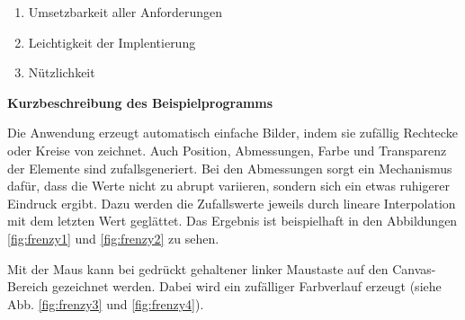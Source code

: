 \documentclass[a4paper, 12pt, hidelinks, listof=totoc, listoftables=totoc, bibliography=totoc]{scrreprt}
\newcommand{\MyMiniSec}[1]{\rmfamily\fontsize{12}{15}\selectfont
	\vspace{7pt}\textbf{#1} %
}
\begin{document}

\begin{enumerate}
	\item Umsetzbarkeit aller Anforderungen
	\item Leichtigkeit der Implentierung
	\item Nützlichkeit
\end{enumerate}

\MyMiniSec{Kurzbeschreibung des Beispielprogramms}

Die Anwendung erzeugt automatisch einfache Bilder, indem sie zufällig Rechtecke oder Kreise von zeichnet. Auch Position, Abmessungen, Farbe und Transparenz der Elemente sind zufallsgeneriert. Bei den Abmessungen sorgt ein Mechanismus dafür, dass die Werte nicht zu abrupt variieren, sondern sich ein etwas ruhigerer Eindruck ergibt. Dazu werden die Zufallswerte jeweils durch lineare Interpolation mit dem letzten Wert geglättet. Das Ergebnis ist beispielhaft in den Abbildungen \ref{fig:frenzy1} und \ref{fig:frenzy2} zu sehen.

Mit der Maus kann bei gedrückt gehaltener linker Maustaste auf den Canvas-Bereich gezeichnet werden. Dabei wird ein zufälliger Farbverlauf erzeugt (siehe Abb. \ref{fig:frenzy3} und \ref{fig:frenzy4}).
\end{document}
